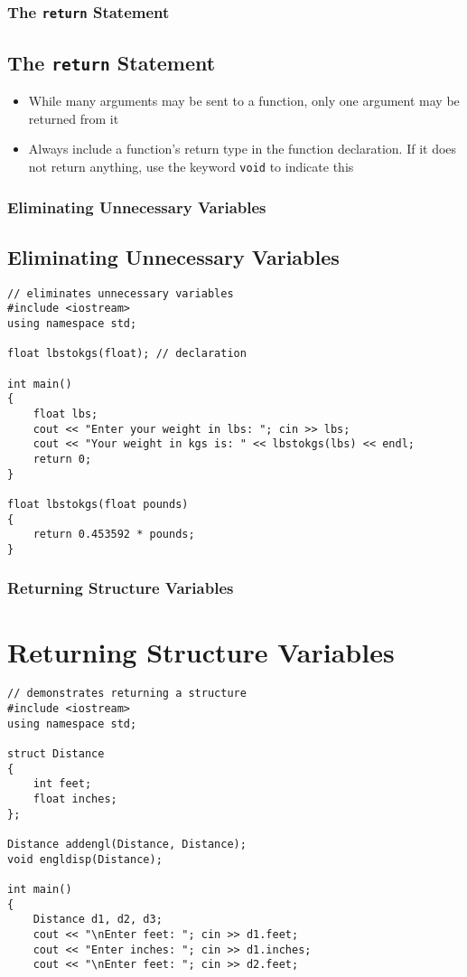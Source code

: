 \documentclass{beamer}
\begin{document}
\begin{frame}
    \frametitle{The \texttt{return} Statement}
    \subsection{The \texttt{return} Statement} %
    \label{sub:the_return_statement}
    \begin{itemize}
        \item While many arguments may be sent to a function, only one argument may be returned from it
        \item Always include a function's return type in the function declaration. If it does not return anything, use the keyword \texttt{void} to indicate this
    \end{itemize}
\end{frame}

\begin{frame} [fragile]
    \frametitle{Eliminating Unnecessary Variables}
    \subsection{Eliminating Unnecessary Variables} %
    \label{sub:eliminating_unnecessary_variables}
    \lstset{style=mystyle}
\begin{lstlisting}
// eliminates unnecessary variables
#include <iostream>
using namespace std;

float lbstokgs(float); // declaration

int main()
{
    float lbs;
    cout << "Enter your weight in lbs: "; cin >> lbs;
    cout << "Your weight in kgs is: " << lbstokgs(lbs) << endl;
    return 0;
}

float lbstokgs(float pounds)
{
    return 0.453592 * pounds;
}
\end{lstlisting}
\end{frame}

\begin{frame} [fragile]
    \frametitle{Returning Structure Variables}
    \section{Returning Structure Variables} %
    \label{sec:returning_structure_variables}
    \lstset{style=mystyle}
\begin{lstlisting}
// demonstrates returning a structure
#include <iostream>
using namespace std;

struct Distance
{
    int feet;
    float inches;
};

Distance addengl(Distance, Distance);
void engldisp(Distance);

int main()
{
    Distance d1, d2, d3;
    cout << "\nEnter feet: "; cin >> d1.feet;
    cout << "Enter inches: "; cin >> d1.inches;
    cout << "\nEnter feet: "; cin >> d2.feet;
\end{lstlisting}
\end{frame}
\end{document}
